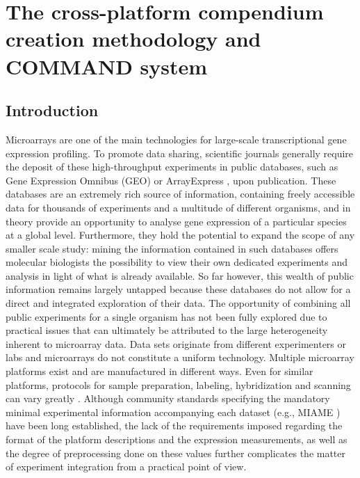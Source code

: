 \chapter{The cross-platform compendium creation methodology and COMMAND 
system}\label{ch:command}


\instructionsintroduction


\section{Introduction}

Microarrays are one of the main technologies for large-scale transcriptional gene expression profiling. To promote data sharing, scientific journals generally require the deposit of these high-throughput experiments in public databases, such as Gene Expression Omnibus (GEO) \cite{Barrett2011} or ArrayExpress \cite{Parkinson2009}, upon publication. These databases are an extremely rich source of information, containing freely accessible data for thousands of experiments and a multitude of different organisms, and in theory provide an opportunity to analyse gene expression of a particular species at a global level. Furthermore, they hold the potential to expand the scope of any smaller scale study: mining the information contained in such databases offers molecular biologists the possibility to view their own dedicated experiments and analysis in light of what is already available. So far however, this wealth of public information remains largely untapped because these databases do not allow for a direct and integrated exploration of their data. The opportunity of combining all public experiments for a single organism has not been fully explored due to practical issues that can ultimately be attributed to the large heterogeneity inherent to microarray data. Data sets originate from different experimenters or labs and microarrays do not constitute a uniform technology. Multiple microarray platforms exist and are manufactured in different ways.  Even for similar platforms, protocols for sample preparation, labeling, hybridization and scanning can vary greatly \cite{Kerr2001,Zakharkin2005}. Although community standards specifying the mandatory minimal experimental information accompanying each dataset (e.g., MIAME \cite{Brazma2001}) have been long established, the lack of the requirements \cite{Brazma2009} imposed regarding the format of the platform descriptions and the expression measurements, as well as the degree of preprocessing done on these values further complicates the matter of experiment integration from a practical point of view.


